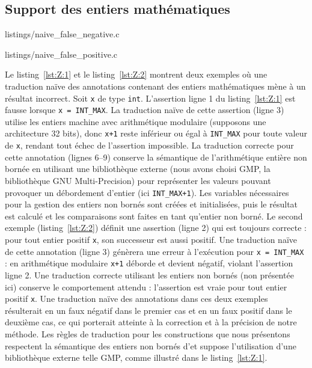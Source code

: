 \subsection{Support des entiers mathématiques}\label{sec:integers}



                {listings/naive_false_negative.c}


                {listings/naive_false_positive.c}


Le listing~\ref{lst:Z:1} et le listing~\ref{lst:Z:2} montrent deux exemples où
une traduction naïve des annotations contenant des entiers mathématiques mène
à un résultat incorrect.
Soit \lstinline'x' de type \lstinline'int'.
L'assertion ligne 1 du listing~\ref{lst:Z:1} est fausse lorsque
\lstinline'x = INT_MAX'.
La traduction naïve de cette assertion (ligne 3) utilise les entiers machine
avec arithmétique modulaire (supposons une architecture 32 bits), donc
\lstinline'x+1' reste inférieur ou égal à \lstinline'INT_MAX' pour toute valeur
de \lstinline'x', rendant tout échec de l'assertion impossible.
La traduction correcte pour cette annotation (lignes 6--9) conserve la
sémantique de l'arithmétique entière non bornée en utilisant une bibliothèque
externe (nous avons choisi GMP, la bibliothèque GNU Multi-Precision) pour
représenter les valeurs pouvant provoquer un débordement d'entier (ici
\lstinline'INT_MAX+1').
Les variables nécessaires pour la gestion des entiers non bornés sont créées et
initialisées, puis le résultat est calculé et les comparaisons sont faites en
tant qu'entier non borné.
Le second exemple (listing~\ref{lst:Z:2}) définit une assertion \eacsl (ligne 2)
qui est toujours correcte : pour tout entier positif \lstinline'x', son
successeur est aussi positif.
Une traduction naïve de cette annotation (ligne 3) génèrera une erreur à
l'exécution pour \lstinline'x = INT_MAX' : en arithmétique modulaire
\lstinline'x+1' déborde et devient négatif, violant l'assertion ligne 2.
Une traduction correcte utilisant les entiers non bornés (non présentée ici)
conserve le comportement attendu : l'assertion est vraie pour tout entier
positif \lstinline'x'.
Une traduction naïve des annotations dans ces deux exemples résulterait en un
faux négatif dans le premier cas et en un faux positif dans le deuxième cas, ce
qui porterait atteinte à la correction et à la précision de notre méthode.
Les règles de traduction pour les constructions \eacsl que nous présentons
respectent la sémantique des entiers non bornés d'\eacsl et suppose
l'utilisation d'une bibliothèque externe telle GMP, comme illustré dans le
listing~\ref{lst:Z:1}.




